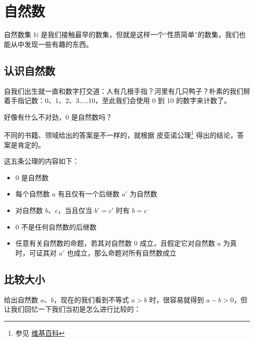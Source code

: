 \chapter{自然数}

自然数集 $\mathbb{N}$ 是我们接触最早的数集，但就是这样一个“性质简单”的数集，我们也能从中发现一些有趣的东西。

\section{认识自然数}

自我们出生就一直和数字打交道：人有几根手指？河里有几只鸭子？朴素的我们掰着手指记数：0、1、2、3……10，至此我们会使用 0 到 10 的数字来计数了。

好像有什么不对劲，0 是自然数吗？

不同的书籍、领域给出的答案是不一样的，就根据 皮亚诺公理\footnote{参见 \href{https://zh.wikipedia.org/wiki/\%E7\%9A\%AE\%E4\%BA\%9A\%E8\%AF\%BA\%E5\%85\%AC\%E7\%90\%86}{维基百科}} 得出的结论，答案是肯定的。

这五条公理的内容如下：

\begin{itemize}
  \item $0$ 是自然数
  \item 每个自然数 $a$ 有且仅有一个后继数 $a'$ 为自然数
  \item 对自然数 $b$、$c$，当且仅当 $b' = c'$ 时有 $b = c$
  \item $0$ 不是任何自然数的后继数
  \item 任意有关自然数的命题，若其对自然数 $0$ 成立，且假定它对自然数 $a$ 为真时，可证其对 $a'$ 也成立，那么命题对所有自然数成立
\end{itemize}

\section{比较大小}

给出自然数 $a$、$b$，现在的我们看到不等式 $a > b$ 时，很容易就得到 $a - b > 0$，但让我们回忆一下我们当初是怎么进行比较的：

\begin{center}
\end{center}

